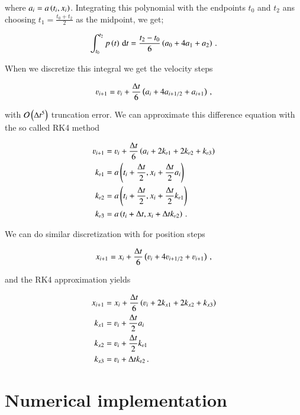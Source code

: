 \documentclass[11pt,english,a4paper]{article}
\begin{document}
\begin{flushleft}
where $a_i = a\left({t_i,x_i}\right)$. Integrating this polynomial with the endpoints $t_0$ and $t_2$ ans choosing $t_1=\frac{t_0+t_2}{2}$ as the midpoint, we get;

\begin{align*}
\int_{t_0}^{t_2} p\left({t}\right)\,\mathrm{d}t = \frac{t_2-t_0}{6}\left({a_0 + 4 a_1 + a_2}\right)\,.
\end{align*}

When we discretize this integral we get the velocity steps

\begin{align*}
\varv_{i+1} = \varv_i + \frac{\Delta t}{6}\p{a_{i} + 4 a_{i+1/2} + a_{i+1}} \,,
\end{align*}

with $\mathcal{O}\left({\Delta t^5}\right)$ truncation error. We can approximate this difference equation with the so called RK4 method

\begin{align}
\varv_{i+1} &= \varv_i + \frac{\Delta t}{6}\p{a_i+2 k_{\varv1} + 2 k_{\varv2} + k_{\varv3}}
\label{eq_9}\\
k_{\varv1} &= a\p{t_i+\frac{\Delta t}{2},x_i + \frac{\Delta t}{2}a_i}
\label{eq_10}\\
k_{\varv2} &= a\p{t_i+\frac{\Delta t}{2},x_i + \frac{\Delta t}{2} k_{\varv1}}
\label{eq_11}\\
k_{\varv3} &= a\p{t_i+\Delta t,x_i + \Delta t k_{\varv2}} \,.
\label{eq_12}
\end{align}

We can do similar discretization with for position steps

\begin{align*}
x_{i+1} = x_i + \frac{\Delta t}{6}\p{\varv_{i} + 4 \varv_{i+1/2} + \varv_{i+1}} \,,
\end{align*}

and the RK4 approximation yields

\begin{align}
x_{i+1} &= x_i + \frac{\Delta t}{6}\p{\varv_i+2 k_{x1} + 2 k_{x2} + k_{x3}}
\label{eq_13}\\
k_{x1} &=  \varv_i + \frac{\Delta t}{2} a_i
\label{eq_14}\\
k_{x2} &= \varv_i + \frac{\Delta t}{2} k_{\varv1}
\label{eq_15}\\
k_{x3} &= \varv_i + \Delta t k_{\varv2} \,.
\label{eq_16}
\end{align}

\section{Numerical implementation}


\end{flushleft}
\end{document}
